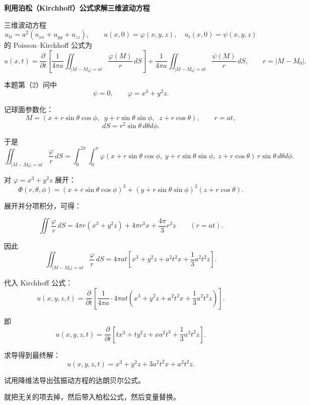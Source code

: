 \begin{solution}
\textbf{利用泊松（Kirchhoff）公式求解三维波动方程}

三维波动方程
\[
u_{tt}=a^{2}(u_{xx}+u_{yy}+u_{zz}),
\qquad 
u(x,0)=\varphi(x,y,z),\quad 
u_t(x,0)=\psi(x,y,z)
\]
的 Poisson–Kirchhoff 公式为
\[
u(x,t)
=
\frac{\partial}{\partial t}
\left[
\frac{1}{4\pi a}
\iint_{|M-M_0|=at}
\frac{\varphi(M)}{r}\, dS
\right]
+
\frac{1}{4\pi a}
\iint_{|M-M_0|=at}
\frac{\psi(M)}{r}\, dS,
\qquad r=|M-M_0|.
\]

本题第（2）问中
\[
\psi=0,\qquad \varphi=x^{3}+y^{2}z.
\]

记球面参数化：
\[
M=(x+r\sin\theta\cos\phi,\;\; y+r\sin\theta\sin\phi,\;\; z+r\cos\theta),
\qquad r=at,
\]
\[
dS = r^{2}\sin\theta \, d\theta d\phi.
\]

于是
\[
\iint_{|M-M_0|=at} \frac{\varphi}{r}\, dS
=
\int_{0}^{2\pi}\!\!\int_{0}^{\pi}
\varphi(x+r\sin\theta\cos\phi,\; y+r\sin\theta\sin\phi,\; z+r\cos\theta)
\, r\sin\theta\, d\theta d\phi.
\]

对 \(\varphi=x^{3}+y^{2}z\) 展开：
\[
\Phi(r,\theta,\phi)
=
(x+r\sin\theta\cos\phi)^{3}
+
(y+r\sin\theta\sin\phi)^{2}(z+r\cos\theta).
\]

展开并分项积分，可得：

\[
\iint \frac{\varphi}{r}\, dS
=
4\pi r(x^{3}+y^{2}z)
+4\pi r^{3}x
+\frac{4\pi}{3}r^{3}z
\qquad (r=at).
\]

因此
\[
\iint_{|M-M_0|=at} \frac{\varphi}{r}\, dS
=
4\pi at\left[
x^{3}+y^{2}z + a^{2}t^{2}x + \frac13 a^{2}t^{2}z
\right].
\]

代入 Kirchhoff 公式：
\[
u(x,y,z,t)
=
\frac{\partial}{\partial t}
\left[
\frac{1}{4\pi a}
\cdot
4\pi at
\left(
x^{3}+y^{2}z + a^{2}t^{2}x + \frac13 a^{2}t^{2}z
\right)
\right].
\]

即
\[
u(x,y,z,t)
=
\frac{\partial}{\partial t}
\left[
t x^{3}
+
t y^{2}z
+
x a^{2} t^{3}
+
\frac13 a^{2} t^{2} z
\right].
\]

求导得到最终解：
\[
\boxed{
u(x,y,z,t)
=
x^{3}
+y^{2}z
+3a^{2}t^{2}x
+a^{2}t^{2}z.
}
\]

\end{solution}
\begin{homework}[2]
试用降维法导出弦振动方程的达朗贝尔公式。

\end{homework}
\begin{dxtips}
    就把无关的项去掉，然后带入柏松公式，然后变量替换。
\end{dxtips}
